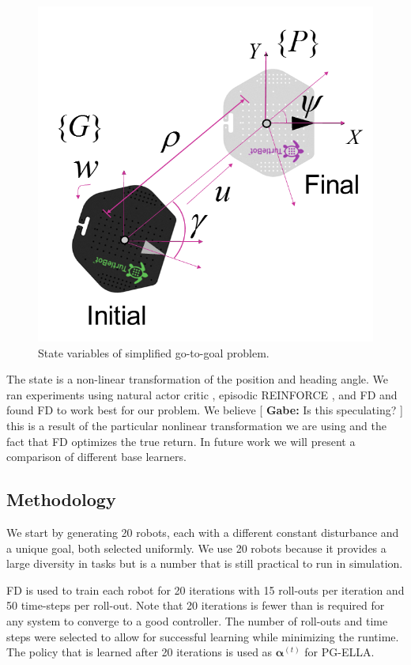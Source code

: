 \documentclass{aamas2016}
\newcommand{\note}[3]{{\color{#2} [ \ding{42} \textbf{#1:} {\small #3} ]}}
\newcommand{\comGabe}[1]{\note{Gabe}{cyan}{#1}}
\begin{document}
\begin{figure}[!htbp]
    \centering
        \includegraphics[width=.45\textwidth]{images/unicycle.png}
        \caption{State variables of simplified go-to-goal problem.}\label{fig:numfeat}
\end{figure}
The state is a non-linear transformation of the position and heading angle. We ran experiments using natural actor critic \cite{peters2008natural}, episodic REINFORCE \cite{williams1992simple}, and FD \cite{Bagnell-2013} and found FD to work best for our problem. We believe \comGabe{Is this speculating?} this is a result of the particular nonlinear transformation we are using and the fact that FD optimizes the true return. In future work we will present a comparison of different base learners. 

\subsection{Methodology}
We start by generating 20 robots, each with a different constant disturbance and a unique goal, both selected uniformly. 
We use 20 robots because it provides a large diversity in tasks but is a number that is still practical to run in simulation. 

FD is used to train each robot for 20 iterations with 15 roll-outs per iteration and 50 time-steps per roll-out.
Note that 20 iterations is fewer than is required for any system to converge to a good controller. 
The number of roll-outs and time steps were selected to allow for successful learning while minimizing the runtime. 
The policy that is learned after 20 iterations is used as %
$\boldsymbol{\alpha}^{(t)}$ for PG-ELLA. %
\end{document}
